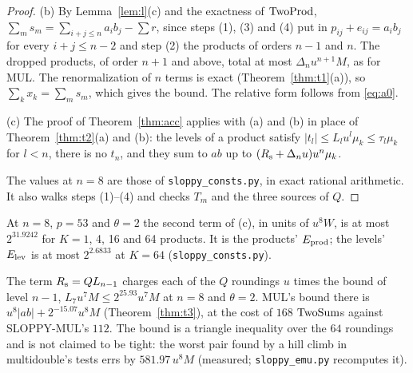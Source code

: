 \begin{proof}
(b) By Lemma~\ref{lem:l}(c) and the exactness of $\mathrm{TwoProd}$, $\sum_m s_m = \sum_{i+j \le n}a_ib_j - \sum r$, since
steps (1), (3) and (4) put in $p_{ij} + e_{ij} = a_ib_j$ for every $i+j \le n-2$ and step (2) the products of orders
$n-1$ and $n$. The dropped products, of order $n+1$ and above, total at most $\Delta_nu^{n+1}M$, as for MUL. The
renormalization of $n$ terms is exact (Theorem~\ref{thm:t1}(a)), so $\sum_k x_k = \sum_m s_m$, which gives the bound.
The relative form follows from \eqref{eq:a0}.

(c) The proof of Theorem~\ref{thm:acc} applies with (a) and (b) in place of Theorem~\ref{thm:t2}(a) and (b): the levels
of a product satisfy $|t_l| \le L_lu^l\mu_k \le \tau_l\mu_k$ for $l < n$, there is no $t_n$, and they sum to $ab$ up to
$(R_{\rm s} + \Delta_nu)u^n\mu_k$.

The values at $n = 8$ are those of \texttt{sloppy\_consts.py}, in exact rational arithmetic. It also walks steps
(1)--(4) and checks $T_m$ and the three sources of $Q$.
\end{proof}

At $n = 8$, $p = 53$ and $\theta = 2$ the second term of (c), in units of $u^8W$, is at most $2^{31.9242}$ for $K =
1$, 4, 16 and 64 products. It is the products' $E_{\rm prod}$; the levels' $E_{\rm lev}$ is at most
$2^{2.6833}$ at $K = 64$ (\texttt{sloppy\_consts.py}).

\begin{remark}
The term $R_{\rm s} = QL_{n-1}$ charges each of the $Q$ roundings $u$ times the bound of level $n-1$, $L_7u^7M \le
2^{25.93}u^7M$ at $n = 8$ and $\theta = 2$. MUL's bound there is $u^8|ab| + 2^{-15.07}u^8M$ (Theorem~\ref{thm:t3}), at
the cost of $168$ $\mathrm{TwoSum}$s against SLOPPY-MUL's $112$. The bound is a triangle inequality over the $64$ roundings
and is not claimed to be tight: the worst pair found by a hill climb in multidouble's tests errs by $581.97\,u^8M$
(measured; \texttt{sloppy\_emu.py} recomputes it).
\end{remark}
